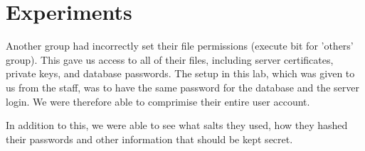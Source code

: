 \section{Experiments}
\label{sec:experiments}

Another group had incorrectly set their file permissions (execute bit for 'others' group).
This gave us access to all of their files, including server certificates, private keys, and database passwords.
The setup in this lab, which was given to us from the staff, was to have the same password for the database and the server login.
We were therefore able to comprimise their entire user account.

In addition to this, we were able to see what salts they used, how they hashed their passwords and other information that should be kept secret.
